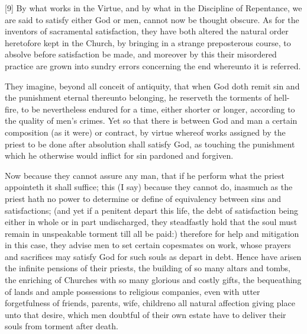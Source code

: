 [9] By what works in the Virtue, and by what in the Discipline of Repentance, we are said to satisfy either God or men, cannot now be thought obscure.
As for the inventors of sacramental satisfaction, they have both altered the natural order heretofore kept in the Church, by bringing in a strange preposterous course, to absolve before satisfaction be made, and moreover by this their misordered practice are grown into sundry errors concerning the end whereunto it is referred.

They imagine, beyond all conceit of antiquity, that when God doth remit sin and the punishment eternal thereunto belonging, he reserveth the torments of hell-fire, to be nevertheless endured for a time, either shorter or longer, according to the quality of men’s crimes. Yet so that there is between God and man a certain composition (as it were) or contract, by virtue whereof works assigned by the priest to be done after absolution shall satisfy God, as touching the punishment which he otherwise would inflict for sin pardoned and forgiven.

Now because they cannot assure any man, that if he perform what the priest appointeth it shall suffice; this (I say) because they cannot do, inasmuch as the priest hath no power to determine or define of equivalency between sins and satisfactions; (and yet if a penitent depart this life, the debt of satisfaction being either in whole or in part undischarged, they steadfastly hold that the soul must remain in unspeakable torment till all be paid:) therefore for help and mitigation in this case, they advise men to set certain copesmates on work, whose prayers and sacrifices may satisfy God for such souls  as depart in debt. Hence have arisen the infinite pensions of their priests, the building of so many altars and tombs, the enriching of Churches with so many glorious and costly gifts, the bequeathing of lands and ample possessions to religious companies, even with utter forgetfulness of friends, parents, wife, childreno all natural affection giving place unto that desire, which men doubtful of their own estate have to deliver their souls from torment after death.

